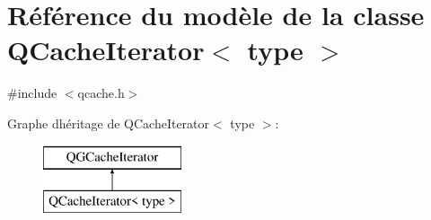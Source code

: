 \hypertarget{class_q_cache_iterator}{}\section{Référence du modèle de la classe Q\+Cache\+Iterator$<$ type $>$}
\label{class_q_cache_iterator}


{\ttfamily \#include $<$qcache.\+h$>$}

Graphe d\textquotesingle{}héritage de Q\+Cache\+Iterator$<$ type $>$\+:\begin{figure}[H]
\begin{center}
\leavevmode
\includegraphics[height=2.000000cm]{class_q_cache_iterator}
\end{center}
\end{figure}
